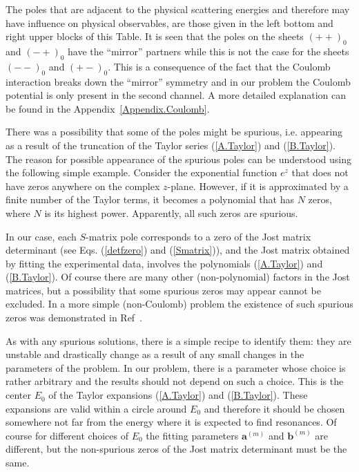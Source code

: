 \documentclass[12pt]{article}
\begin{document}
The poles that are adjacent to the physical scattering energies and 
therefore may have influence on physical observables, are those given in the 
left bottom and right upper blocks of this Table. It is seen that the poles on 
the sheets $(++)_0$ and $(-+)_0$ have the ``mirror'' partners while this is not 
the case for the sheets $(--)_0$ and $(+-)_0$. This is a consequence of the 
fact that the Coulomb interaction breaks down the ``mirror'' symmetry and in 
our problem the Coulomb potential is only present in the second channel. A more 
detailed explanation can be found in the Appendix~\ref{Appendix.Coulomb}.

There was a possibility that some of the poles might be spurious, i.e. appearing 
as a result of the truncation of the Taylor series (\ref{A.Taylor}) and 
(\ref{B.Taylor}). The reason for possible appearance of the spurious poles can 
be understood using the following simple example. Consider the exponential 
function $e^z$ that does not have zeros anywhere on the complex $z$-plane. 
However, if it is approximated by a finite number of the Taylor terms, it 
becomes a polynomial that has $N$ zeros, where $N$ is its highest power. 
Apparently, all such zeros are spurious.

In our case, each $S$-matrix pole
corresponds to a zero of the Jost matrix determinant (see Eqs. (\ref{detfzero})
and (\ref{Smatrix})), and the Jost matrix obtained by fitting the experimental
data, involves the polynomials (\ref{A.Taylor}) and (\ref{B.Taylor}). Of course
there are many other (non-polynomial) factors in the Jost matrices, but a
possibility that some spurious zeros may appear cannot be excluded.
In a more simple (non-Coulomb) problem the existence of such spurious zeros was
demonstrated in Ref~\cite{my.effRange}.

As with any spurious solutions, there is a simple recipe to identify them: they
are unstable and drastically change as a result of any small changes in the
parameters of the problem. In our problem, there is a parameter whose choice is
rather arbitrary and the results should not depend on such a choice. This is
the center $E_0$ of the Taylor expansions (\ref{A.Taylor}) and (\ref{B.Taylor}).
These expansions are valid within a circle around $E_0$ and therefore it should
be chosen somewhere not far from the energy where it is expected to find
resonances. Of course for different choices of $E_0$ the fitting parameters
$\bm{a}^{(m)}$ and $\bm{b}^{(m)}$ are different, but the non-spurious zeros of
the Jost matrix determinant must be the same.
\end{document}
